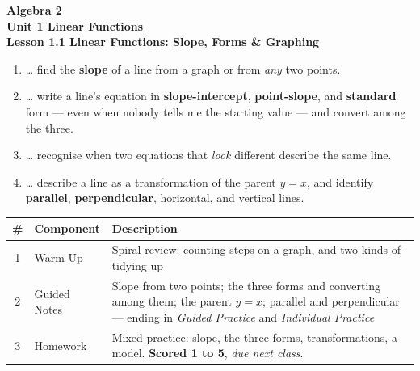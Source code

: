 \documentclass[10pt]{article}
\begin{document}
\vspace{-0.8in}

\begin{center}
  {\color{white}\textbf{\LARGE Algebra 2}}\\[4pt]
  {\color{forestmid}\large\textbf{Unit 1 \quad Linear Functions}}\\[6pt]
  {\color{white}\textbf{\large Lesson 1.1 \quad Linear Functions: Slope, Forms \& Graphing}}
\end{center}

\vspace{0.22in}
\namedateperiod
\vspace{0.18in}

\begin{learningtargetbox}
\small
\begin{enumerate}[leftmargin=1.5em, itemsep=5pt]
  \item \ldots{} find the \textbf{slope} of a line from a graph or from \emph{any} two points.
  \item \ldots{} write a line's equation in \textbf{slope-intercept}, \textbf{point-slope}, and
        \textbf{standard} form --- even when nobody tells me the starting value --- and convert
        among the three.
  \item \ldots{} recognise when two equations that \emph{look} different describe the same line.
  \item \ldots{} describe a line as a transformation of the parent $y=x$, and identify
        \textbf{parallel}, \textbf{perpendicular}, horizontal, and vertical lines.
\end{enumerate}
\end{learningtargetbox}

\vspace{0.14in}

\begin{tocbox}
\small
\renewcommand{\arraystretch}{1.5}
\begin{tabularx}{\linewidth}{@{} c l X @{}}
\rowcolor{forestbg}
\textbf{\#} & \textbf{Component} & \textbf{Description} \\
\midrule
1 & Warm-Up        & Spiral review: counting steps on a graph, and two kinds of tidying up \\
2 & Guided Notes   & Slope from two points; the three forms and converting among them; the
                     parent $y=x$; parallel and perpendicular --- ending in \emph{Guided
                     Practice} and \emph{Individual Practice} \\
3 & Homework       & Mixed practice: slope, the three forms, transformations, a model.
                     \textbf{Scored 1 to 5}, \emph{due next class}. \\
\end{tabularx}
\end{tocbox}
\end{document}
